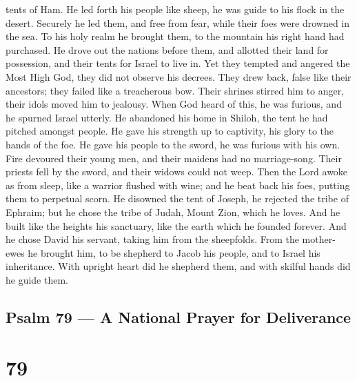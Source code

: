tents of Ham.  He led forth his people like sheep, he was
guide to his flock in the desert.  Securely he led them,
and free from fear, while their foes were drowned in the sea.
 To his holy realm he brought them, to the mountain his
right hand had purchased.  He drove out the nations before
them, and allotted their land for possession, and their tents for Israel
to live in.  Yet they tempted and angered the Most High
God, they did not observe his decrees.  They drew back,
false like their ancestors; they failed like a treacherous bow.
 Their shrines stirred him to anger, their idols moved him
to jealousy.  When God heard of this, he was furious, and
he spurned Israel utterly.  He abandoned his home in
Shiloh, the tent he had pitched amongst people.  He gave
his strength up to captivity, his glory to the hands of the foe.
 He gave his people to the sword, he was furious with his
own.  Fire devoured their young men, and their maidens had
no marriage-song.  Their priests fell by the sword, and
their widows could not weep.  Then the Lord awoke as from
sleep, like a warrior flushed with wine;  and he beat back
his foes, putting them to perpetual scorn.  He disowned the
tent of Joseph, he rejected the tribe of Ephraim;  but he
chose the tribe of Judah, Mount Zion, which he loves.  And
he built like the heights his sanctuary, like the earth which he founded
forever.  And he chose David his servant, taking him from
the sheepfolds.  From the mother-ewes he brought him, to be
shepherd to Jacob his people, and to Israel his inheritance.
 With upright heart did he shepherd them, and with skilful
hands did he guide them.

\hypertarget{psalm-79-a-national-prayer-for-deliverance}{%
\subsection{Psalm 79 --- A National Prayer for
Deliverance}\label{psalm-79-a-national-prayer-for-deliverance}}

\hypertarget{section-78}{%
\section{79}\label{section-78}}

